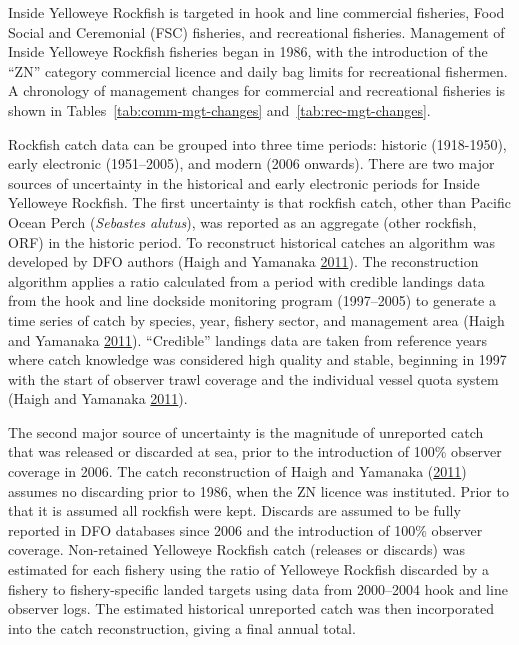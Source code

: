 \documentclass[11pt]{book}
\begin{document}
\clearpage

\label{app:catch-data}

Inside Yelloweye Rockfish is targeted in hook and line commercial fisheries, Food Social and Ceremonial (FSC) fisheries, and recreational fisheries. Management of Inside Yelloweye Rockfish fisheries began in 1986, with the introduction of the ``ZN'' category commercial licence and daily bag limits for recreational fishermen. A chronology of management changes for commercial and recreational fisheries is shown in Tables~\ref{tab:comm-mgt-changes} and~\ref{tab:rec-mgt-changes}.

\hypertarget{sec:com-catch-data}{%
\label{sec:com-catch-data}}

Rockfish catch data can be grouped into three time periods: historic (1918-1950), early electronic (1951--2005), and modern (2006 onwards). There are two major sources of uncertainty in the historical and early electronic periods for Inside Yelloweye Rockfish. The first uncertainty is that rockfish catch, other than Pacific Ocean Perch (\emph{Sebastes alutus}), was reported as an aggregate (other rockfish, ORF) in the historic period. To reconstruct historical catches an algorithm was developed by DFO authors (Haigh and Yamanaka \protect\hyperlink{ref-haigh2011}{2011}). The reconstruction algorithm applies a ratio calculated from a period with credible landings data from the hook and line dockside monitoring program (1997--2005) to generate a time series of catch by species, year, fishery sector, and management area (Haigh and Yamanaka \protect\hyperlink{ref-haigh2011}{2011}). ``Credible'' landings data are taken from reference years where catch knowledge was considered high quality and stable, beginning in 1997 with the start of observer trawl coverage and the individual vessel quota system (Haigh and Yamanaka \protect\hyperlink{ref-haigh2011}{2011}).

The second major source of uncertainty is the magnitude of unreported catch that was released or discarded at sea, prior to the introduction of 100\% observer coverage in 2006. The catch reconstruction of Haigh and Yamanaka (\protect\hyperlink{ref-haigh2011}{2011}) assumes no discarding prior to 1986, when the ZN licence was instituted. Prior to that it is assumed all rockfish were kept. Discards are assumed to be fully reported in DFO databases since 2006 and the introduction of 100\% observer coverage. Non-retained Yelloweye Rockfish catch (releases or discards) was estimated for each fishery using the ratio of Yelloweye Rockfish discarded by a fishery to fishery-specific landed targets using data from 2000--2004 hook and line observer logs. The estimated historical unreported catch was then incorporated into the catch reconstruction, giving a final annual total.
\end{document}
